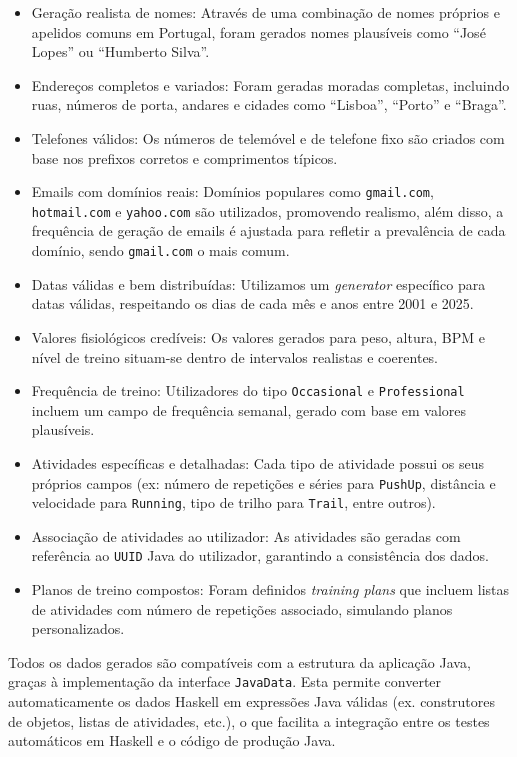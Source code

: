 \documentclass[12pt, a4paper]{article}
\begin{document}
\begin{itemize}
  \item Geração realista de nomes: Através de uma combinação de nomes próprios e apelidos comuns em
  Portugal, foram gerados nomes plausíveis como ``José Lopes'' ou ``Humberto Silva''.
  \item Endereços completos e variados: Foram geradas moradas completas, incluindo ruas, números de
  porta, andares e cidades como ``Lisboa'', ``Porto'' e ``Braga''.
  \item Telefones válidos: Os números de telemóvel e de telefone fixo são criados com base nos
  prefixos corretos e comprimentos típicos.
  \item Emails com domínios reais: Domínios populares como \texttt{gmail.com}, \texttt{hotmail.com}
  e \texttt{yahoo.com} são utilizados, promovendo realismo, além disso, a frequência de geração de
  emails é ajustada para refletir a prevalência de cada domínio, sendo \texttt{gmail.com} o mais
  comum.
  \item Datas válidas e bem distribuídas: Utilizamos um \emph{generator} específico para datas
  válidas, respeitando os dias de cada mês e anos entre 2001 e 2025.
  \item Valores fisiológicos credíveis: Os valores gerados para peso, altura, BPM e nível de treino
  situam-se dentro de intervalos realistas e coerentes.
  \item Frequência de treino: Utilizadores do tipo \texttt{Occasional} e \texttt{Professional}
  incluem um campo de frequência semanal, gerado com base em valores plausíveis.
  \item Atividades específicas e detalhadas: Cada tipo de atividade possui os seus próprios campos
  (ex: número de repetições e séries para \texttt{PushUp}, distância e velocidade para
  \texttt{Running}, tipo de trilho para \texttt{Trail}, entre outros).
  \item Associação de atividades ao utilizador: As atividades são geradas com referência ao
  \texttt{UUID} Java do utilizador, garantindo a consistência dos dados.
  \item Planos de treino compostos: Foram definidos \emph{training plans} que incluem listas de
  atividades com número de repetições associado, simulando planos personalizados.
\end{itemize}

Todos os dados gerados são compatíveis com a estrutura da aplicação Java, graças à implementação da
interface \texttt{JavaData}. Esta permite converter automaticamente os dados Haskell em expressões
Java válidas (ex. construtores de objetos, listas de atividades, etc.), o que facilita a integração
entre os testes automáticos em Haskell e o código de produção Java.
\end{document}
